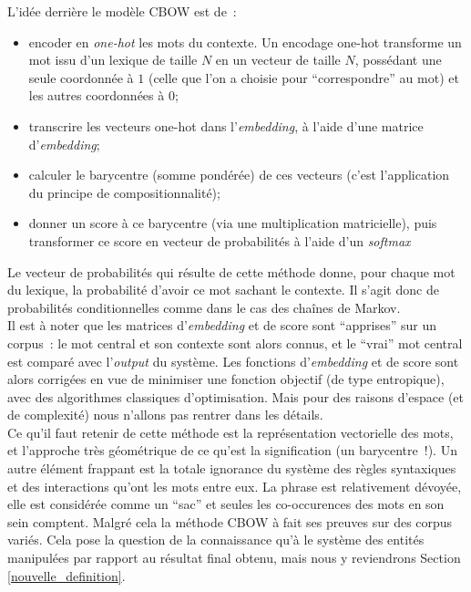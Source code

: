 \documentclass{article}
\begin{document}
				L'idée derrière le modèle CBOW est de~:
				\begin{itemize}
					\item encoder en \textit{one-hot} les mots du contexte. Un encodage one-hot transforme un mot issu d'un lexique de taille $N$ en un vecteur de taille $N$, possédant une seule coordonnée à $1$ (celle que l'on a choisie pour ``correspondre'' au mot) et les autres coordonnées à $0$;
					\item transcrire les vecteurs one-hot dans l'\textit{embedding}, à l'aide d'une matrice d'\textit{embedding};
					\item calculer le barycentre (somme pondérée) de ces vecteurs (c'est l'application du principe de compositionnalité);
					\item donner un score à ce barycentre (via une multiplication matricielle), puis transformer ce score en vecteur de probabilités à l'aide d'un \textit{softmax}
				\end{itemize}
				Le vecteur de probabilités qui résulte de cette méthode donne, pour chaque mot du lexique, la probabilité d'avoir ce mot sachant le contexte. Il s'agit donc de probabilités conditionnelles comme dans le cas des chaînes de Markov.\\
				
				Il est à noter que les matrices d'\textit{embedding} et de score sont ``apprises'' sur un corpus~: le mot central et son contexte sont alors connus, et le ``vrai'' mot central est comparé avec l'\textit{output} du système. Les fonctions d'\textit{embedding} et de score sont alors corrigées en vue de minimiser une fonction objectif (de type entropique), avec des algorithmes classiques d'optimisation. Mais pour des raisons d'espace (et de complexité) nous n'allons pas rentrer dans les détails. \\
				
				Ce qu'il faut retenir de cette méthode est la représentation vectorielle des mots, et l'approche très géométrique de ce qu'est la signification (un barycentre~!). Un autre élément frappant est la totale ignorance du système des règles syntaxiques et des interactions qu'ont les mots entre eux. La phrase est relativement dévoyée, elle est considérée comme un ``sac'' et seules les co-occurences des mots en son sein comptent. Malgré cela la méthode CBOW à fait ses preuves sur des corpus variés. Cela pose la question de la connaissance qu'à le système des entités manipulées par rapport au résultat final obtenu, mais nous y reviendrons Section \ref{nouvelle_definition}.
\end{document}
